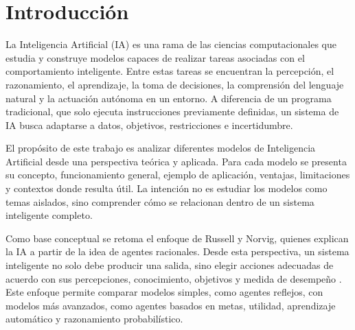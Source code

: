 \section{Introducción}

La Inteligencia Artificial (IA) es una rama de las ciencias computacionales que estudia y construye modelos capaces de realizar tareas asociadas con el comportamiento inteligente. Entre estas tareas se encuentran la percepción, el razonamiento, el aprendizaje, la toma de decisiones, la comprensión del lenguaje natural y la actuación autónoma en un entorno. A diferencia de un programa tradicional, que solo ejecuta instrucciones previamente definidas, un sistema de IA busca adaptarse a datos, objetivos, restricciones e incertidumbre.

El propósito de este trabajo es analizar diferentes modelos de Inteligencia Artificial desde una perspectiva teórica y aplicada. Para cada modelo se presenta su concepto, funcionamiento general, ejemplo de aplicación, ventajas, limitaciones y contextos donde resulta útil. La intención no es estudiar los modelos como temas aislados, sino comprender cómo se relacionan dentro de un sistema inteligente completo.

Como base conceptual se retoma el enfoque de Russell y Norvig, quienes explican la IA a partir de la idea de agentes racionales. Desde esta perspectiva, un sistema inteligente no solo debe producir una salida, sino elegir acciones adecuadas de acuerdo con sus percepciones, conocimiento, objetivos y medida de desempeño \cite{russell2012}. Este enfoque permite comparar modelos simples, como agentes reflejos, con modelos más avanzados, como agentes basados en metas, utilidad, aprendizaje automático y razonamiento probabilístico.
